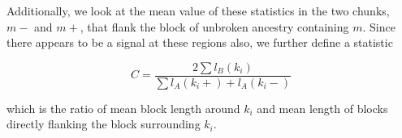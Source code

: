 \documentclass[11pt,letterpaper]{article}
\begin{document}

Additionally, we look at the mean value of these statistics in the two chunks, $m-$ and $m+$, that flank the block of unbroken ancestry containing $m$. Since there appears to be a signal at these regions also, we further define a statistic 

$$C =  \frac{2\sum{l_B(k_i)}}{\sum{l_A(k_i+)+l_A(k_i-)}}$$

which is the ratio of mean block length around $k_i$ and mean length of blocks directly flanking the block surrounding $k_i$.












\end{document}
